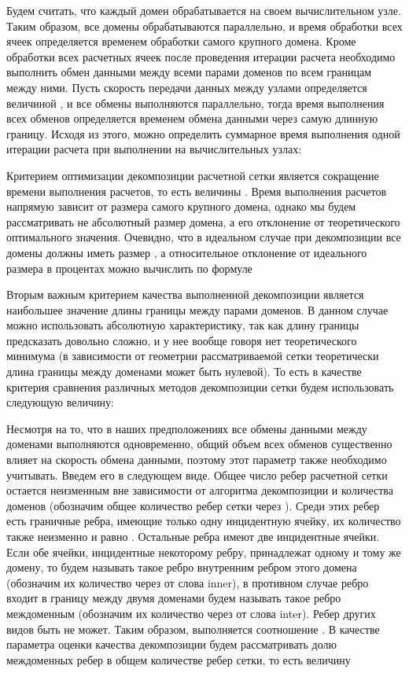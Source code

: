 \documentclass[
11pt,%
tightenlines,%
twoside,%
onecolumn,%
nofloats,%
nobibnotes,%
nofootinbib,%
superscriptaddress,%
noshowpacs,%
centertags]%
{revtex4}
\begin{document}
Будем считать, что каждый домен обрабатывается на своем вычислительном узле. Таким образом, все домены обрабатываются параллельно, и время обработки всех ячеек определяется временем обработки самого крупного домена. Кроме обработки всех расчетных ячеек после проведения итерации расчета необходимо выполнить обмен данными между всеми парами доменов по всем границам между ними. Пусть скорость передачи данных между узлами определяется величиной  , и все обмены выполняются параллельно, тогда время выполнения всех обменов определяется временем обмена данными через самую длинную границу. Исходя из этого, можно определить суммарное время выполнения одной итерации расчета при выполнении на   вычислительных узлах:
	 
Критерием оптимизации декомпозиции расчетной сетки является сокращение времени выполнения расчетов, то есть величины  . Время выполнения расчетов напрямую зависит от размера самого крупного домена, однако мы будем рассматривать не абсолютный размер домена, а его отклонение от теоретического оптимального значения. Очевидно, что в идеальном случае при декомпозиции все домены должны иметь размер  , а относительное отклонение от идеального размера в процентах можно вычислить по формуле
	  
Вторым важным критерием качества выполненной декомпозиции является наибольшее значение длины границы между парами доменов. В данном случае можно использовать абсолютную характеристику, так как длину границы предсказать довольно сложно, и у нее вообще говоря нет теоретического минимума (в зависимости от геометрии рассматриваемой сетки теоретически длина границы между доменами может быть нулевой). То есть в качестве критерия сравнения различных методов декомпозиции сетки будем использовать следующую величину:
	  
Несмотря на то, что в наших предположениях все обмены данными между доменами выполняются одновременно, общий объем всех обменов существенно влияет на скорость обмена данными, поэтому этот параметр также необходимо учитывать. Введем его в следующем виде. Общее число ребер расчетной сетки остается неизменным вне зависимости от алгоритма декомпозиции и количества доменов (обозначим общее количество ребер сетки через  ). Среди этих ребер есть граничные ребра, имеющие только одну инцидентную ячейку, их количество также неизменно и равно  . Остальные ребра имеют две инцидентные ячейки. Если обе ячейки, инцидентные некоторому ребру, принадлежат одному и тому же домену, то будем называть такое ребро внутренним ребром этого домена (обозначим их количество через   от слова inner), в противном случае ребро входит в границу между двумя доменами будем называть такое ребро междоменным (обозначим их количество через   от слова inter). Ребер других видов быть не может. Таким образом, выполняется соотношение  . В качестве параметра оценки качества декомпозиции будем рассматривать долю междоменных ребер в общем количестве ребер сетки, то есть величину
	  
\end{document}
